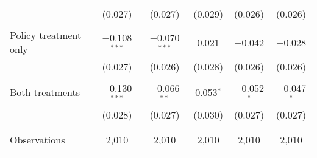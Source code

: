\begin{tabular}{@{\extracolsep{5pt}}lccccc}
  & (0.027) & (0.027) & (0.029) & (0.026) & (0.026) \\ 
  & & & & & \\ 
 Policy treatment only & $-$0.108$^{***}$ & $-$0.070$^{***}$ & 0.021 & $-$0.042 & $-$0.028 \\ 
  & (0.027) & (0.026) & (0.028) & (0.026) & (0.026) \\ 
  & & & & & \\ 
 Both treatments & $-$0.130$^{***}$ & $-$0.066$^{**}$ & 0.053$^{*}$ & $-$0.052$^{*}$ & $-$0.047$^{*}$ \\ 
  & (0.028) & (0.027) & (0.030) & (0.027) & (0.027) \\ 
  & & & & & \\ 
\hline \\[-1.8ex] 

Observations & 2,010 & 2,010 & 2,010 & 2,010 & 2,010 \\ 
\hline 
\hline \\[-1.8ex] 
\end{tabular} 
